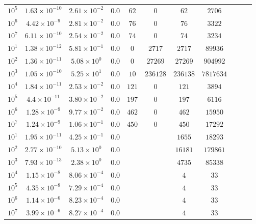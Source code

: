 \begin{tabular}{l c c c c c c c c c c}
$10^5$  &  $1.63 \times 10^{-10}$  &  $2.61 \times 10^{-2}$  &  $0.0$  &  $62$  &  $0$  &  $62$  &  $2706$  & & & \\ 
$10^6$  &  $4.42 \times 10^{-9}$  &  $2.81 \times 10^{-2}$  &  $0.0$  &  $76$  &  $0$  &  $76$  &  $3322$  & & & \\ 
$10^7$  &  $6.11 \times 10^{-10}$  &  $2.54 \times 10^{-2}$  &  $0.0$  &  $74$  &  $0$  &  $74$  &  $3234$  & & & \\ 
\hline \hline
$10^1$  &  $1.38 \times 10^{-12}$  &  $5.81 \times 10^{-1}$  &  $0.0$  &  $0$  &  $2717$  &  $2717$  &  $89936$ & & &  \\ 
$10^2$  &  $1.36 \times 10^{-11}$  &  $5.08 \times 10^{0}$  &  $0.0$  &  $0$  &  $27269$  &  $27269$  &  $904992$  & & & \\ 
$10^3$  &  $1.05 \times 10^{-10}$  &  $5.25 \times 10^{1}$  &  $0.0$  &  $10$  &  $236128$  &  $236138$  &  $7817634$  & & & \\ 
$10^4$  &  $1.84 \times 10^{-11}$  &  $2.53 \times 10^{-2}$  &  $0.0$  &  $121$  &  $0$  &  $121$  &  $3894$  & & & \\ 
$10^5$  &  $4.4 \times 10^{-11}$  &  $3.80 \times 10^{-2}$  &  $0.0$  &  $197$  &  $0$  &  $197$  &  $6116$  & & & \\ 
$10^6$  &  $1.28 \times 10^{-9}$  &  $9.77 \times 10^{-2}$  &  $0.0$  &  $462$  &  $0$  &  $462$  &  $15950$  & & & \\ 
$10^7$  &  $1.24 \times 10^{-9}$  &  $1.06 \times 10^{-1}$  &  $0.0$  &  $450$  &  $0$  &  $450$  &  $17292$  & & & \\ 
\hline \hline
    $10^1$  &  $1.95 \times 10^{-11}$  &  $4.25 \times 10^{-1}$ & $0.0$ &  &  & $1655$ & $18293$ & & & \\ 
    $10^2$  &  $2.77 \times 10^{-10}$  &  $5.13 \times 10^{0}$ & $0.0$ &  &  & $16181$ & $179861$ & & & \\ 
$10^3$  &  $7.93 \times 10^{-13}$  &  $2.38 \times 10^{0}$ & $0.0$ &  &  & $4735$ & $85338$ & & & \\ 
$10^4$  &  $1.15 \times 10^{-8}$  &  $8.06 \times 10^{-4}$ & $0.0$ &  &  & $4$ & $33$ & & & \\ 
$10^5$  &  $4.35 \times 10^{-8}$  &  $7.29 \times 10^{-4}$ & $0.0$ &  &  & $4$ & $33$ & & & \\ 
$10^6$  &  $1.14 \times 10^{-6}$  &  $8.23 \times 10^{-4}$ & $0.0$ &  &  & $4$ & $33$ & & & \\ 
$10^7$  &  $3.99 \times 10^{-6}$  &  $8.27 \times 10^{-4}$ & $0.0$ &  &  & $4$ & $33$ & & & \\ 
\end{tabular}
